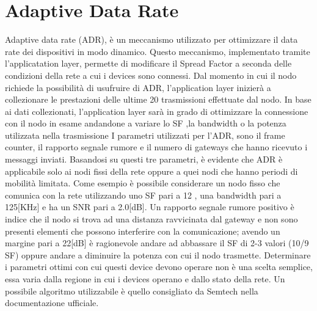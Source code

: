 \section{Adaptive Data Rate}
Adaptive data rate (ADR), è un meccanismo utilizzato per ottimizzare il data
rate dei dispositivi in modo dinamico. Questo meccanismo, implementato tramite
l'applicatation layer, permette di modificare il Spread Factor a seconda delle
condizioni della rete a cui i devices sono connessi. Dal momento in cui il nodo
richiede la possibilità di usufruire di ADR, l'application layer inizierà a
collezionare le prestazioni delle ultime 20 trasmissioni effettuate dal nodo.
In base ai dati collezionati, l'application layer sarà in grado di ottimizzare
la connessione con il nodo in esame andandone a variare lo SF ,la bandwidth o la
potenza utilizzata nella trasmissione I parametri utilizzati per l'ADR, 
sono il frame counter, il
rapporto segnale rumore e il numero di gateways che hanno ricevuto i messaggi
inviati.  Basandosi su questi tre parametri, è evidente che ADR è applicabile
solo ai nodi fissi della rete oppure a quei nodi che hanno periodi di mobilità
limitata.  Come esempio è possibile considerare un nodo fisso che comunica con
la rete utilizzando uno SF pari a 12 , una bandwidth pari a 125[KHz] e ha un SNR
pari a 2.0[dB]. Un rapporto segnale rumore positivo è indice che il nodo si
trova ad una distanza ravvicinata dal gateway e non sono presenti elementi che
possono interferire con la comunicazione; avendo un margine pari a 22[dB] è
ragionevole andare ad abbassare il SF di 2-3 valori (10/9 SF) oppure andare a
diminuire la potenza con cui il nodo trasmette. Determinare i parametri ottimi
con cui questi device devono operare non è una scelta semplice, essa varia dalla
regione in cui i devices operano e dallo stato della rete. Un possibile
algoritmo utilizzabile è quello consigliato da Semtech nella documentazione
ufficiale.

